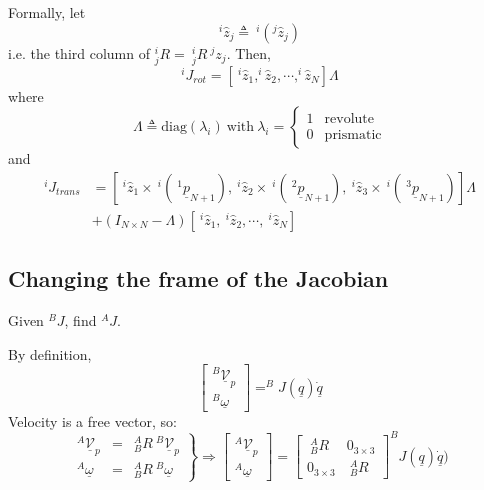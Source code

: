 \documentclass[]{article}
\begin{document}
Formally, let
\begin{displaymath}
	^{i}\hat{z}_{j} \triangleq\ ^{i}(^{j}\hat{z}_{j})
\end{displaymath}
i.e. the third column of $^{i}_{j}R =\ ^{i}_{j}R\ ^{j}z_{j}$. Then,
\begin{displaymath}
^{i}J_{rot} = \left[\ ^{i}\hat{z}_{1}, ^{i}\hat{z}_{2}, \cdots, ^{i}\hat{z}_{N}\right] \Lambda
\end{displaymath}
where
\begin{displaymath}
	\Lambda \triangleq \text{diag}(\lambda_{i})\ \text{with}\ \lambda_{i} = \left\{ \begin{array}{cl} 1 & \text{revolute} \\ 0 & \text{prismatic} \end{array} \right.
\end{displaymath}
and
\begin{displaymath}
\begin{split}
^{i}J_{trans} & = \left[\ \!^{i}\hat{z}_{1} \times\ ^{i}(\ \! ^{1}\underline{p}_{N+1}), \ \!^{i}\hat{z}_{2} \times\ ^{i}(\ \! ^{2}\underline{p}_{N+1}), \ \!^{i}\hat{z}_{3} \times\ ^{i}(\ \! ^{3}\underline{p}_{N+1})\right] \Lambda \\
& + (I_{N \times N} - \Lambda) \left[\ \!^{i}\hat{z}_{1}, \ \!^{i}\hat{z}_{2}, \cdots, \ \!^{i}\hat{z}_{N} \right]
\end{split}
\end{displaymath}

\subsection{Changing the frame of the Jacobian}
Given $^{B}J$, find $^{A}J$.

By definition,
\begin{displaymath}
\left[\begin{array}{c} ^{B}\underline{\mathcal{V}}_{p} \\ ^{B}\underline{\omega} \end{array} \right] = ^{B}J(\underline{q})\underline{\dot{q}}
\end{displaymath}
Velocity is a free vector, so:
\begin{displaymath}
\left. \begin{array}{ccl} ^{A}\underline{\mathcal{V}}_{p} & = & ^{A}_{B}R\ \!^{B}\underline{\mathcal{V}}_{p} \\ ^{A}\underline{\omega} & = & ^{A}_{B}R\ \!^{B}\underline{\omega} \end{array} \right\} \Rightarrow \left[\begin{array}{c} ^{A}\underline{\mathcal{V}}_{p} \\ ^{A}\underline{\omega} \end{array} \right] = \left[ \begin{array}{cc} \ \!^{A}_{B}R & 0_{3 \times 3} \\ 0_{3 \times 3} &  \ \!^{A}_{B}R \end{array} \right]^{B}J(\underline{q})\dot{\underline{q}})
\end{displaymath}
\end{document}
